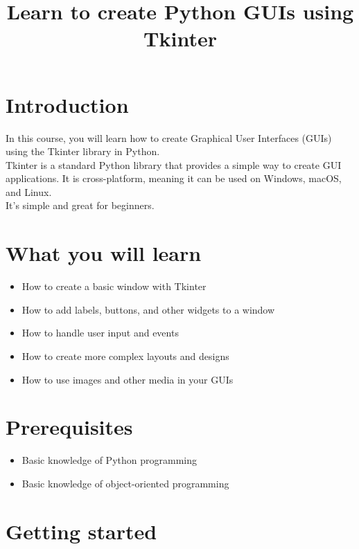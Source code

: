 \documentclass[11pt]{article}
\title{Learn to create Python GUIs using Tkinter}
\providecommand{\tightlist}{%
      \setlength{\itemsep}{0pt}\setlength{\parskip}{0pt}}
\begin{document}
    
    \maketitle
    
    

  

\section{Introduction}\label{introduction}

In this course, you will learn how to create Graphical User Interfaces
(GUIs) using the Tkinter library in Python.\\
Tkinter is a standard Python library that provides a simple way to
create GUI applications. It is cross-platform, meaning it can be used on
Windows, macOS, and Linux.\\
It's simple and great for beginners.

\section{What you will learn}\label{what-you-will-learn}

\begin{itemize}
\tightlist
\item
  How to create a basic window with Tkinter
\item
  How to add labels, buttons, and other widgets to a window
\item
  How to handle user input and events
\item
  How to create more complex layouts and designs
\item
  How to use images and other media in your GUIs
\end{itemize}

\section{Prerequisites}\label{prerequisites}

\begin{itemize}
\tightlist
\item
  Basic knowledge of Python programming
\item
  Basic knowledge of object-oriented programming
\end{itemize}

\section{Getting started}\label{getting-started}
\end{document}
